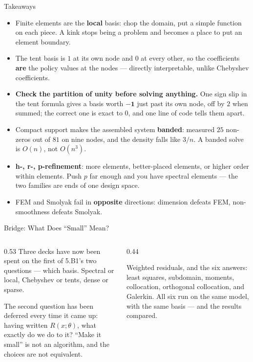 \begin{frame}{Takeaways}
\begin{takeawaybox}
\begin{itemize}\small
  \item Finite elements are the \textbf{local} basis: chop the domain, put a simple function on each piece. A kink stops being a problem and becomes a place to put an element boundary.
  \item The tent basis is $1$ at its own node and $0$ at every other, so the coefficients \textbf{are} the policy values at the nodes --- directly interpretable, unlike Chebyshev coefficients.
  \item \textbf{Check the partition of unity before solving anything.} One sign slip in the tent formula gives a basis worth $\mathbf{-1}$ just past its own node, off by $2$ when summed; the correct one is exact to $0$, and one line of code tells them apart.
  \item Compact support makes the assembled system \textbf{banded}: measured $25$ non-zeros out of $81$ on nine nodes, and the density falls like $3/n$. A banded solve is $O(n)$, not $O(n^{3})$.
  \item \textbf{h-, r-, p-refinement}: more elements, better-placed elements, or higher order within elements. Push $p$ far enough and you have spectral elements --- the two families are ends of one design space.
  \item FEM and Smolyak fail in \textbf{opposite} directions: dimension defeats FEM, non-smoothness defeats Smolyak.
\end{itemize}
\end{takeawaybox}
\end{frame}

\begin{frame}{Bridge: What Does ``Small'' Mean?}
\begin{columns}[T]
\begin{column}{0.53\textwidth}
\small
Three decks have now been spent on the first of 5.B1's two questions --- which basis. Spectral or local, Chebyshev or tents, dense or sparse.
\medskip

The second question has been deferred every time it came up: having written $R(x;\theta)$, what exactly do we do to it? ``Make it small'' is not an algorithm, and the choices are not equivalent.
\end{column}
\begin{column}{0.44\textwidth}
\begin{conceptbox}[title=\textbf{Next (5.B5)}]\small
Weighted residuals, and the six answers: least squares, subdomain, moments, collocation, orthogonal collocation, and Galerkin. All six run on the same model, with the same basis --- and the results compared.
\end{conceptbox}
\end{column}
\end{columns}
\end{frame}



